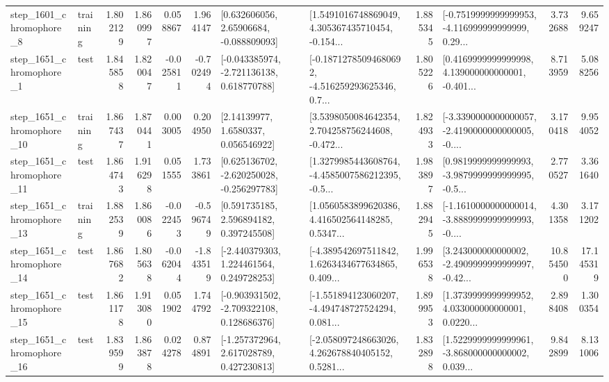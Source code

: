 \begin{tabular}{llrrrrllrlrr}
  step\_1601\_chromophore\_8 &  training &      1.802129 &    1.860997 &      0.058867 &  1.964147 &     [0.632606056, 2.65906684, -0.088809093] &  [1.5491016748869049, 4.305367435710454, -0.154... &       1.885345 &  [-0.7519999999999953, -4.116999999999999, 0.29... &            3.732688 &          9.659247 \\
  step\_1651\_chromophore\_1 &      test &      1.845858 &    1.820047 &     -0.025811 & -0.702494 &   [-0.043385974, -2.721136138, 0.618770788] &  [-0.18712785094680692, -4.516259293625346, 0.7... &       1.805226 &  [0.4169999999999998, 4.139000000000001, -0.401... &            8.713959 &          5.088256 \\
 step\_1651\_chromophore\_10 &  training &      1.867437 &    1.870441 &      0.003005 &  0.204950 &        [2.14139977, 1.6580337, 0.056546922] &  [3.5398050084642354, 2.704258756244608, -0.472... &       1.824933 &  [-3.3390000000000057, -2.4190000000000005, -0.... &            3.170418 &          9.954052 \\
 step\_1651\_chromophore\_11 &      test &      1.864743 &    1.916298 &      0.051555 &  1.733861 &   [0.625136702, -2.620250028, -0.256297783] &  [1.3279985443608764, -4.4585007586212395, -0.5... &       1.983897 &  [0.9819999999999993, -3.9879999999999995, -0.5... &            2.770527 &          3.361640 \\
 step\_1651\_chromophore\_13 &  training &      1.882539 &    1.860086 &     -0.022453 & -0.596749 &     [0.591735185, 2.596894182, 0.397245508] &  [1.0560583899620386, 4.416502564148285, 0.5347... &       1.882945 &  [-1.1610000000000014, -3.8889999999999993, -0.... &            4.301358 &          3.171202 \\
 step\_1651\_chromophore\_14 &      test &      1.867682 &    1.805638 &     -0.062044 & -1.843519 &    [-2.440379303, 1.224461564, 0.249728253] &  [-4.389542697511842, 1.6263434677634865, 0.409... &       1.996538 &  [3.243000000000002, -2.4909999999999997, -0.42... &           10.854500 &         17.145319 \\
 step\_1651\_chromophore\_15 &      test &      1.861178 &    1.913080 &      0.051902 &  1.744792 &   [-0.903931502, -2.709322108, 0.128686376] &  [-1.551894123060207, -4.494748727524294, 0.081... &       1.899953 &  [1.3739999999999952, 4.033000000000001, 0.0220... &            2.898408 &          1.300354 \\
 step\_1651\_chromophore\_16 &      test &      1.839599 &    1.863878 &      0.024278 &  0.874891 &    [-1.257372964, 2.617028789, 0.427230813] &  [-2.058097248663026, 4.262678840405152, 0.5281... &       1.832898 &  [1.5229999999999961, -3.868000000000002, 0.039... &            9.842899 &          8.131006 \\

\end{tabular}

